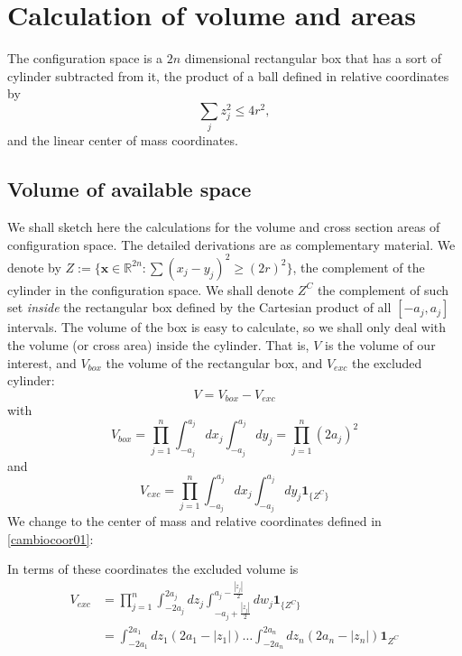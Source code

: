 \documentclass[superscriptaddress,pre,reprint,showpacs,twocolumn]{revtex4-1}
\newcommand{\indicatorsymbol}{\mathbf{1}}
\newcommand{\indicator}[1]{\indicatorsymbol_{ \{   #1 \} } }
\begin{document}
\section{Calculation of volume and areas}

The configuration space is a $2n$ dimensional rectangular box
that has a sort of cylinder subtracted from it, the
product of a ball defined in relative coordinates by
\begin{equation}
  \sum_j z_j^2 \leq 4 r^2,
\end{equation}
and the linear center of mass coordinates.



\subsection{Volume of available space}

We shall sketch here the calculations for the volume and cross section areas
of configuration space. The detailed derivations are as complementary material.
We denote by $Z := \{ \mathbf{x} \in \mathbb{R}^{2n}: \sum (x_j-y_j)^2 \ge (2r)^2 \}$,
the complement of the cylinder in the configuration space.
We shall denote $Z^C$ the complement of such set \emph{inside} the rectangular
box defined by the Cartesian product of all $[-a_j, a_j ]$ intervals.
The volume of the box is easy to calculate, so we shall only deal with
the volume (or cross area) inside the cylinder. That is, $V$ is the volume of
our interest, and $V_{box}$ the volume of the rectangular box, and $V_{exc}$ the
excluded cylinder:
\begin{equation}
V = V_{box} - V_{exc}
\end{equation}
with
\begin{equation}
V_{box} =  \prod_{j=1}^n \int_{-a_j}^{a_j} dx_j \int_{-a_j}^{a_j}  dy_j = \prod_{j=1}^n (2 a_j)^2 
\end{equation}
and
\begin{equation}
V_{exc} =  \prod_{j=1}^n \int_{-a_j}^{a_j} dx_j \int_{-a_j}^{a_j}  dy_j  \indicator{Z^C}
\end{equation}
We change to
the center of mass and relative coordinates defined in \eqref{cambiocoor01}:

In terms of these coordinates the excluded volume is 
\begin{align}
V_{exc} & =  \prod_{j=1}^n \int_{-2a_j}^{2a_j} dz_j \int_{-a_j + \frac{|z_j|}{2}}^{a_j - \frac{|z_j|}{2}}  dw_j  \indicator{Z^C} \\
& = \int_{-2a_1}^{2a_1} dz_1 (2a_1 -|z_1|)  \ldots \int_{-2a_n}^{2a_n} dz_n (2a_n - |z_n|)  \mathbf{1}_{Z^C} 
\end{align}
\end{document}
